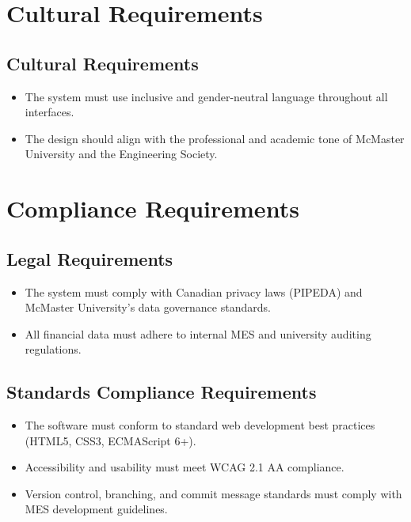 \documentclass[12pt]{article}
\begin{document}
\section{Cultural Requirements}

\subsection{Cultural Requirements}
\begin{itemize}
    \item The system must use inclusive and gender-neutral language throughout all interfaces.
    \item The design should align with the professional and academic tone of McMaster University and the Engineering Society.
\end{itemize}

\section{Compliance Requirements}

\subsection{Legal Requirements}
\begin{itemize}
    \item The system must comply with Canadian privacy laws (PIPEDA) and McMaster University’s data governance standards.
    \item All financial data must adhere to internal MES and university auditing regulations.
\end{itemize}

\subsection{Standards Compliance Requirements}
\begin{itemize}
    \item The software must conform to standard web development best practices (HTML5, CSS3, ECMAScript 6+).
    \item Accessibility and usability must meet WCAG 2.1 AA compliance.
    \item Version control, branching, and commit message standards must comply with MES development guidelines.
\end{itemize}
\end{document}

